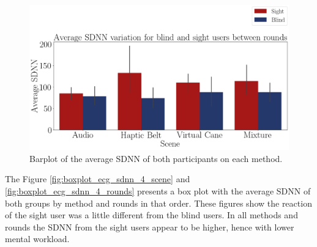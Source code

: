 \begin{figure}[!htb]
    \centering
    \includegraphics[width = 0.8\linewidth]{Resultados/ECG/Figuras/png/barplot_ecg_sdnn_4_scene.png}
    \caption{Barplot of the average SDNN of both participants on each method.}
    \label{fig:barplot_ecg_sdnn_4_scene}
\end{figure}

The Figure \ref{fig:boxplot_ecg_sdnn_4_scene} and \ref{fig:boxplot_ecg_sdnn_4_rounds} presents a box plot with the average SDNN of both groups by method and rounds in that order. These figures show the reaction of the sight user was a little different from the blind users. In all methods and rounds the SDNN from the sight users appear to be higher, hence with lower mental workload.

